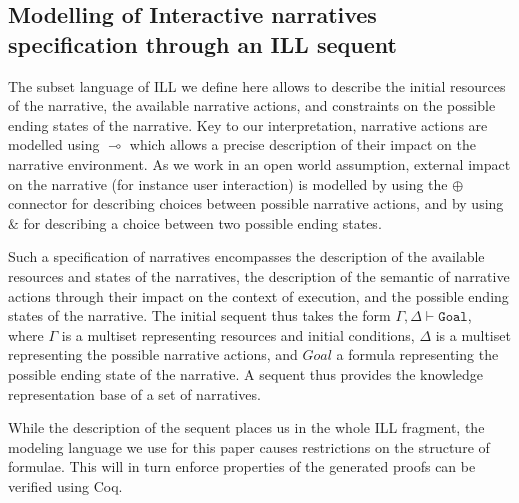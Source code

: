 \documentclass[runningheads,a4paper]{llncs}
\begin{document}
\subsection{Modelling of Interactive narratives specification through an ILL sequent\label{subsec:narrative_to_sequent}}
%
The subset language of ILL we define here allows to describe the initial resources of the narrative, the available narrative actions, and constraints on the possible ending states of the narrative. Key to our interpretation, narrative actions are modelled using $\multimap$ which allows a precise description of their impact on the narrative environment. As we work in an open world assumption, external impact on the narrative (for instance user interaction) is modelled by using the $\oplus$ connector for describing choices between possible narrative actions, and by using $\&$ for describing a choice between two possible ending states.

Such a specification of narratives encompasses the description of the available resources and states of the narratives, the description of the semantic of narrative actions through their impact on the context of execution, and the possible ending states of the narrative. The initial sequent thus takes the form $\Gamma , \Delta \vdash \mathtt{Goal}$, where $\Gamma$ is a multiset representing resources and initial conditions, $\Delta$ is a multiset representing the possible narrative actions, and $Goal$ a formula representing the possible ending state of the narrative. A sequent thus provides the knowledge representation base of a set of narratives. 

While the description of the sequent places us in the whole ILL fragment, the modeling language we use for this paper causes restrictions on the structure of formulae. This will in turn enforce properties of the generated proofs can be verified using Coq.
\end{document}
